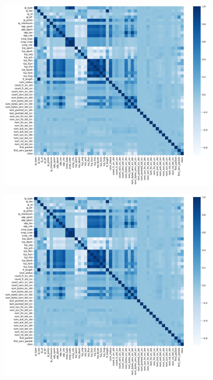 \begin{figure}
    \centering
    \includegraphics[width=1\linewidth]{figures//uploads/correlations.png}
\end{figure}

\begin{figure}
    \centering
    \includegraphics[width=1\linewidth]{figures//uploads/correlations.png}
\end{figure}

